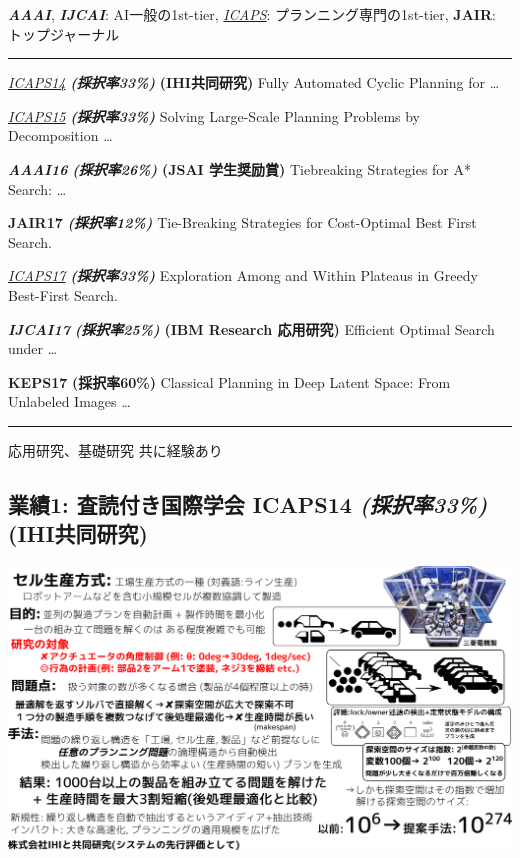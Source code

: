 \begin{center}
\textbf{\emph{AAAI}}, \textbf{\emph{IJCAI}}: AI一般の1st-tier, \uline{\emph{ICAPS}}: プランニング専門の1st-tier, \textbf{JAIR}: トップジャーナル
\end{center}

\rule{\linewidth}{0.5pt}

\uline{\emph{ICAPS14}} \textbf{\emph{(採択率33\%)}} \textbf{(IHI共同研究)} Fully Automated Cyclic Planning for \ldots{}

\uline{\emph{ICAPS15}} \textbf{\emph{(採択率33\%)}} Solving Large-Scale Planning Problems by Decomposition \ldots{}

\textbf{\emph{AAAI16}} \textbf{\emph{(採択率26\%)}} \textbf{(JSAI 学生奨励賞)} Tiebreaking Strategies for A* Search: \ldots{}

\textbf{JAIR17} \textbf{\emph{(採択率12\%)}} Tie-Breaking Strategies for Cost-Optimal Best First Search. 

\uline{\emph{ICAPS17}} \textbf{\emph{(採択率33\%)}} Exploration Among and Within Plateaus in Greedy Best-First Search. 

\textbf{\emph{IJCAI17}} \textbf{\emph{(採択率25\%)}} \textbf{(IBM Research 応用研究)} Efficient Optimal Search under \ldots{}

\textbf{KEPS17} \textbf{(採択率60\%)} Classical Planning in Deep Latent Space: From Unlabeled Images \ldots{}

\rule{\linewidth}{0.5pt}

応用研究、基礎研究 共に経験あり

\subsection{業績1: 査読付き国際学会 ICAPS14 \textbf{\emph{(採択率33\%)}} \textbf{(IHI共同研究)}}
\label{sec:orgheadline20}

\includegraphics{img/assemble-icaps14.png}

